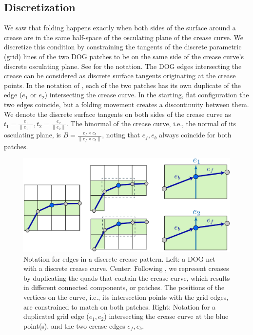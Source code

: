 \subsection{Discretization}
We saw that folding happens exactly when both sides of the surface around a crease are in the same half-space of the osculating plane of the crease curve. We discretize this condition by constraining the tangents of the discrete parametric (grid) lines of the two DOG patches to be on the same side of the crease curve's discrete osculating plane. See  for the notation. The DOG edges intersecting the crease can be considered as discrete surface tangents originating at the crease points. In the notation of , each of the two patches has its own duplicate of the edge ($e_1$ or $e_2$) intersecting the crease curve. In the starting, flat configuration the two edges coincide, but a folding movement creates a discontinuity between them. We denote the discrete surface tangents on both sides of the crease curve as $t_1 = \frac{e_1}{\|e_1\|}, t_2 = \frac{e_2}{\|e_2\|}$. The binormal of the crease curve, i.e., the normal of its osculating plane, is $B = \frac{e_f \times e_b}{\|e_f \times e_b\|}$, noting that $e_f,e_b$ always coincide for both patches.

\begin{figure} [t]
	\centering
	\includegraphics[width=\linewidth]{figures/osc_plane_discretization}
	\caption{Notation for edges in a discrete crease pattern. Left: a DOG net with a discrete crease curve. Center: Following \cite{rabi2018shape}, we represent creases by duplicating the quads that contain the crease curve, which results in different connected components, or patches. The positions of the vertices on the curve, i.e., its intersection points with the grid edges, are constrained to match on both patches. Right: Notation for a duplicated grid edge ($e_1, e_2$) intersecting the crease curve at the blue point(s), and the two crease edges $e_f,e_b$. }
	\label{fig:osc_plane_discretization}
\end{figure}

